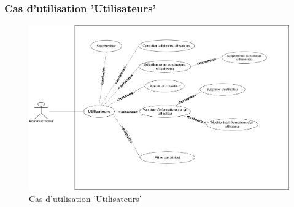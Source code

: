 \subsubsection*{Cas d'utilisation 'Utilisateurs'}
\begin{figure}[H]
    \centering
    \includegraphics[scale=0.1]{ACR/Diagrammes/Utilisateurs.jpg}
    \caption{Cas d'utilisation 'Utilisateurs'}
\end{figure}
